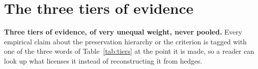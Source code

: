 \documentclass{article}
\begin{document}
\section{The three tiers of evidence}
\label{app:tiers}
\noindent\textbf{Three tiers of evidence, of very unequal weight, never pooled.} Every empirical claim about the preservation hierarchy or the criterion is tagged with one of the three words of Table~\ref{tab:tiers} at the point it is made, so a reader can look up what licenses it instead of reconstructing it from hedges.
\end{document}

